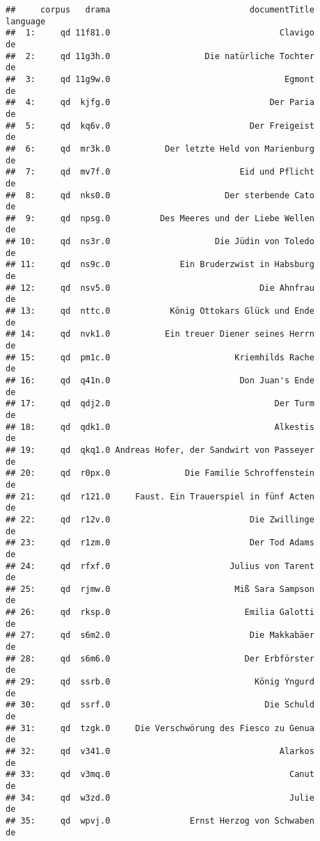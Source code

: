 \documentclass[]{book}
\begin{document}
\begin{verbatim}
##     corpus   drama                            documentTitle language
##  1:     qd 11f81.0                                  Clavigo       de
##  2:     qd 11g3h.0                   Die natürliche Tochter       de
##  3:     qd 11g9w.0                                   Egmont       de
##  4:     qd  kjfg.0                                Der Paria       de
##  5:     qd  kq6v.0                            Der Freigeist       de
##  6:     qd  mr3k.0           Der letzte Held von Marienburg       de
##  7:     qd  mv7f.0                          Eid und Pflicht       de
##  8:     qd  nks0.0                       Der sterbende Cato       de
##  9:     qd  npsg.0          Des Meeres und der Liebe Wellen       de
## 10:     qd  ns3r.0                     Die Jüdin von Toledo       de
## 11:     qd  ns9c.0              Ein Bruderzwist in Habsburg       de
## 12:     qd  nsv5.0                              Die Ahnfrau       de
## 13:     qd  nttc.0            König Ottokars Glück und Ende       de
## 14:     qd  nvk1.0           Ein treuer Diener seines Herrn       de
## 15:     qd  pm1c.0                         Kriemhilds Rache       de
## 16:     qd  q41n.0                          Don Juan's Ende       de
## 17:     qd  qdj2.0                                 Der Turm       de
## 18:     qd  qdk1.0                                 Alkestis       de
## 19:     qd  qkq1.0 Andreas Hofer, der Sandwirt von Passeyer       de
## 20:     qd  r0px.0               Die Familie Schroffenstein       de
## 21:     qd  r121.0     Faust. Ein Trauerspiel in fünf Acten       de
## 22:     qd  r12v.0                            Die Zwillinge       de
## 23:     qd  r1zm.0                            Der Tod Adams       de
## 24:     qd  rfxf.0                        Julius von Tarent       de
## 25:     qd  rjmw.0                         Miß Sara Sampson       de
## 26:     qd  rksp.0                           Emilia Galotti       de
## 27:     qd  s6m2.0                            Die Makkabäer       de
## 28:     qd  s6m6.0                           Der Erbförster       de
## 29:     qd  ssrb.0                             König Yngurd       de
## 30:     qd  ssrf.0                               Die Schuld       de
## 31:     qd  tzgk.0     Die Verschwörung des Fiesco zu Genua       de
## 32:     qd  v341.0                                  Alarkos       de
## 33:     qd  v3mq.0                                    Canut       de
## 34:     qd  w3zd.0                                    Julie       de
## 35:     qd  wpvj.0                Ernst Herzog von Schwaben       de

\end{verbatim}
\end{document}
